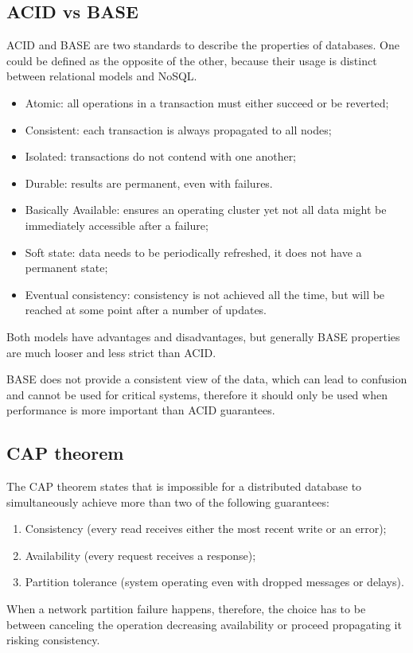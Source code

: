 \subsection{ACID vs BASE}
ACID and BASE are two standards to describe the properties of databases. One could be defined as the opposite of the other, because their usage is distinct between relational models and NoSQL.

\begin{itemize}
	\item Atomic: all operations in a transaction must either succeed or be reverted;
	\item Consistent: each transaction is always propagated to all nodes;
	\item Isolated: transactions do not contend with one another;
	\item Durable: results are permanent, even with failures.
\end{itemize}

\begin{itemize}
	\item Basically Available: ensures an operating cluster yet not all data might be immediately accessible after a failure;
	\item Soft state: data needs to be periodically refreshed, it does not have a permanent state;
	\item Eventual consistency: consistency is not achieved all the time, but will be reached at some point after a number of updates.
\end{itemize}

Both models have advantages and disadvantages, but generally BASE properties are much looser and less strict than ACID. 

BASE does not provide a consistent view of the data, which can lead to confusion and cannot be used for critical systems, therefore it should only be used when performance is more important than ACID guarantees.

\subsection{CAP theorem}
The CAP theorem states that is impossible for a distributed database to simultaneously achieve more than two of the following guarantees:
\begin{enumerate}
	\item Consistency (every read receives either the most recent write or an error);
	\item Availability (every request receives a response);
	\item Partition tolerance (system operating even with dropped messages or delays).
\end{enumerate}
When a network partition failure happens, therefore, the choice has to be between canceling the operation decreasing availability or proceed propagating it risking consistency.


